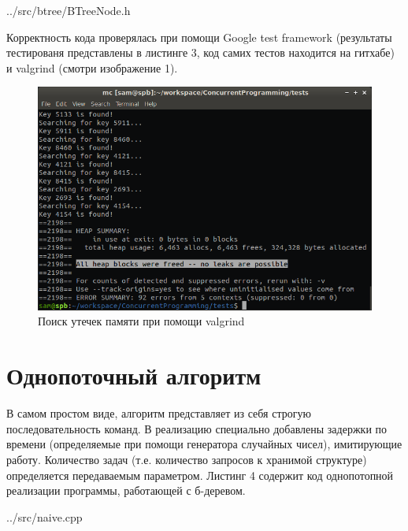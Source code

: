 \documentclass[a4paper, 12pt]{report}		%
\begin{document}

{../src/btree/BTreeNode.h}

Корректность кода проверялась при помощи Google test framework (результаты тестированя представлены в листинге 3, код самих тестов находится на гитхабе) и valgrind (смотри изображение 1).



\begin{figure}[h!]
\centering
\includegraphics[scale=0.68]{res/valgrind}
\caption{Поиск утечек памяти при помощи valgrind}
\end{figure}


\chapter*{Однопоточный алгоритм}

В самом простом виде, алгоритм представляет из себя строгую последовательность команд. В реализацию специально добавлены задержки по времени (определяемые при помощи генератора случайных чисел), имитирующие работу. Количество задач (т.е. количество запросов к хранимой структуре) определяется передаваемым параметром. Листинг 4 содержит код однопотопной реализации программы, работающей с б-деревом.


{../src/naive.cpp}


\end{document}
